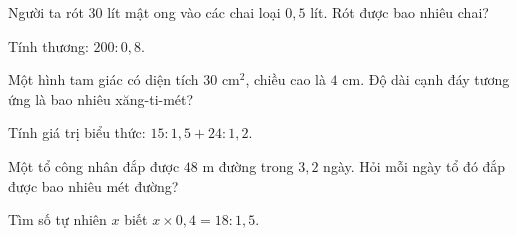 \begin{ex}
  Người ta rót $30$ lít mật ong vào các chai loại $0{,}5$ lít. Rót được bao nhiêu chai?
\end{ex}

\begin{ex}
  Tính thương: $200 : 0{,}8$.
\end{ex}

\begin{ex}
  Một hình tam giác có diện tích $30\text{ cm}^2$, chiều cao là $4\text{ cm}$. Độ dài cạnh đáy tương ứng là bao nhiêu xăng-ti-mét?
\end{ex}

\begin{ex}
  Tính giá trị biểu thức: $15 : 1{,}5 + 24 : 1{,}2$.
\end{ex}

\begin{ex}
  Một tổ công nhân đắp được $48\text{ m}$ đường trong $3{,}2$ ngày. Hỏi mỗi ngày tổ đó đắp được bao nhiêu mét đường?
\end{ex}

\begin{ex}
  Tìm số tự nhiên $x$ biết $x \times 0{,}4 = 18 : 1{,}5$.
\end{ex}
